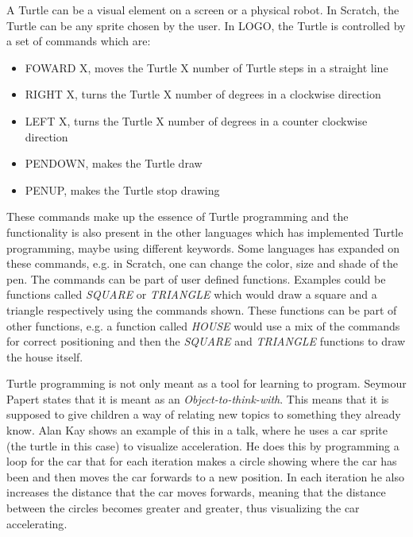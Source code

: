 A Turtle can be a visual element on a screen or a physical robot. In Scratch, the Turtle can be any sprite chosen by the user. In LOGO, the Turtle is controlled by a set of commands which are:
\begin{itemize}
\item FOWARD X, moves the Turtle X number of Turtle steps in a straight line
\item RIGHT X, turns the Turtle X number of degrees in a clockwise direction
\item LEFT X, turns the Turtle X number of degrees in a counter clockwise direction
\item PENDOWN, makes the Turtle draw
\item PENUP, makes the Turtle stop drawing
\end{itemize}
These commands make up the essence of Turtle programming and the functionality is also present in the other languages which has implemented Turtle programming, maybe using different keywords. Some languages has expanded on these commands, e.g. in Scratch, one can change the color, size and shade of the pen. The commands can be part of user defined functions. Examples could be functions called \emph{SQUARE} or \emph{TRIANGLE} which would draw a square and a triangle respectively using the commands shown. These functions can be part of other functions, e.g. a function called \emph{HOUSE} would use a mix of the commands for correct positioning and then the \emph{SQUARE} and \emph{TRIANGLE} functions to draw the house itself\cite{turtle_func}.

Turtle programming is not only meant as a tool for learning to program. Seymour Papert states that it is meant as an \emph{Object-to-think-with}. This means that it is supposed to give children a way of relating new topics to something they already know. Alan Kay shows an example of this in a talk, where he uses a car sprite (the turtle in this case) to visualize acceleration. He does this by programming a loop for the car that for each iteration makes a circle showing where the car has been and then moves the car forwards to a new position. In each iteration he also increases the distance that the car moves forwards, meaning that the distance between the circles becomes greater and greater, thus visualizing the car accelerating\cite{alan_turtle_video}.

